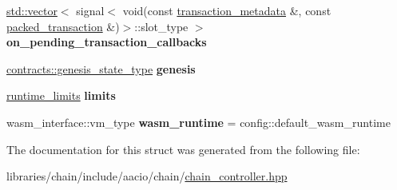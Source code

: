 \begin{DoxyCompactItemize}
\mbox{\label{structaacio_1_1chain_1_1chain__controller_1_1controller__config_ad6fd14e879a8cd1aee51e60ad2c23f89}} 
\mbox{\hyperlink{classstd_1_1vector}{std\+::vector}}$<$ signal$<$ void(const \mbox{\hyperlink{classaacio_1_1chain_1_1transaction__metadata}{transaction\+\_\+metadata}} \&, const \mbox{\hyperlink{structaacio_1_1chain_1_1packed__transaction}{packed\+\_\+transaction}} \&)$>$\+::slot\+\_\+type $>$ {\bfseries on\+\_\+pending\+\_\+transaction\+\_\+callbacks}
\item 
\mbox{\label{structaacio_1_1chain_1_1chain__controller_1_1controller__config_a5c0dcf343236ce607ffadefa3ec29ea5}} 
\mbox{\hyperlink{structaacio_1_1chain_1_1contracts_1_1genesis__state__type}{contracts\+::genesis\+\_\+state\+\_\+type}} {\bfseries genesis}
\item 
\mbox{\label{structaacio_1_1chain_1_1chain__controller_1_1controller__config_a8e5e768a8de10c8c1594bb0be651f6e0}} 
\mbox{\hyperlink{structaacio_1_1chain_1_1chain__controller_1_1runtime__limits}{runtime\+\_\+limits}} {\bfseries limits}
\item 
\mbox{\label{structaacio_1_1chain_1_1chain__controller_1_1controller__config_abbeb9048e8f98bdf4273b3ade321e7a5}} 
wasm\+\_\+interface\+::vm\+\_\+type {\bfseries wasm\+\_\+runtime} = config\+::default\+\_\+wasm\+\_\+runtime
\end{DoxyCompactItemize}


The documentation for this struct was generated from the following file\+:\begin{DoxyCompactItemize}
\item 
libraries/chain/include/aacio/chain/\mbox{\hyperlink{chain__controller_8hpp}{chain\+\_\+controller.\+hpp}}\end{DoxyCompactItemize}
